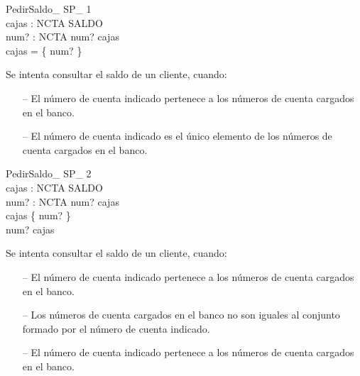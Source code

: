 \begin{schema}{PedirSaldo\_ SP\_ 1}\\
 cajas : NCTA \pfun SALDO \\
 num? : NCTA 
\where
 num? \in \dom cajas \\
 \dom cajas = \{ num? \}
\end{schema}

\begin{tcolorbox}[colback=gray!5!white,colframe=gray!50!black,
  colbacktitle=gray!75!black,title=PedirSaldo\_SP\_1]
  Se intenta consultar el saldo de un cliente, cuando:
     \begin{itemize}
        \item[--]{El número de cuenta indicado pertenece a los números de cuenta cargados en el banco.}
        \item[--]{El número de cuenta indicado es el único elemento de los números de cuenta cargados en el banco.}
     \end{itemize}
\end{tcolorbox}


\begin{schema}{PedirSaldo\_ SP\_ 2}\\
 cajas : NCTA \pfun SALDO \\
 num? : NCTA 
\where
 num? \in \dom cajas \\
 \dom cajas \neq \{ num? \} \\
 num? \in \dom cajas
\end{schema}

\begin{tcolorbox}[colback=gray!5!white,colframe=gray!50!black,
  colbacktitle=gray!75!black,title=PedirSaldo\_SP\_2]
  Se intenta consultar el saldo de un cliente, cuando:
     \begin{itemize}
        \item[--]{El número de cuenta indicado pertenece a los números de cuenta cargados en el banco.}
        \item[--]{Los números de cuenta cargados en el banco no son iguales al conjunto formado por el número de cuenta indicado.}
        \item[--]{El número de cuenta indicado pertenece a los números de cuenta cargados en el banco.}
     \end{itemize}
\end{tcolorbox}



